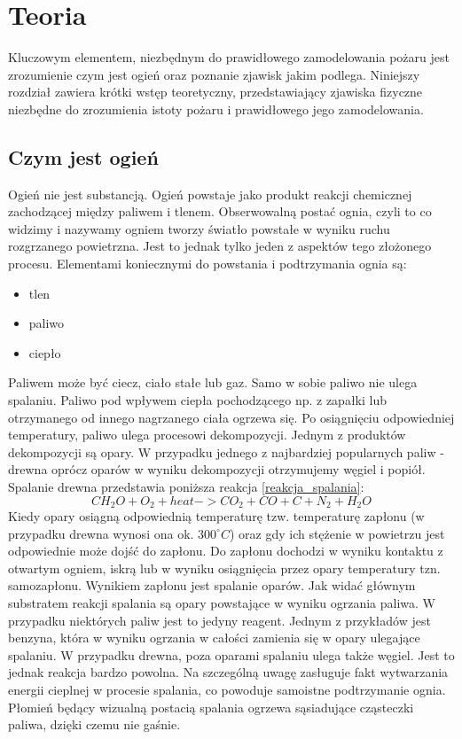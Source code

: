 ﻿%
\chapter{Teoria}
\label{cha:Teoria}
Kluczowym elementem, niezbędnym do prawidłowego zamodelowania pożaru
jest zrozumienie czym jest ogień oraz poznanie zjawisk jakim podlega. Niniejszy rozdział zawiera
krótki wstęp teoretyczny, przedstawiający zjawiska fizyczne niezbędne do zrozumienia istoty 
pożaru i prawidłowego jego zamodelowania.
\section {Czym jest ogień}
Ogień nie jest substancją.
Ogień powstaje jako produkt reakcji chemicznej zachodzącej między paliwem i tlenem.
Obserwowalną postać ognia, czyli to co widzimy i nazywamy ogniem tworzy światło powstałe w wyniku ruchu rozgrzanego powietrzna.
Jest to jednak tylko jeden z aspektów tego złożonego procesu.
Elementami koniecznymi do powstania i podtrzymania ognia są:
\begin{itemize}
\item tlen
\item paliwo
\item ciepło
\end{itemize}


Paliwem może być ciecz, ciało stałe lub gaz. Samo w sobie paliwo nie ulega spalaniu. 
Paliwo pod wpływem ciepła pochodzącego np. z zapałki lub otrzymanego od innego nagrzanego ciała ogrzewa się. Po osiągnięciu
odpowiedniej temperatury, paliwo ulega procesowi dekompozycji. Jednym z produktów dekompozycji
są opary. W przypadku jednego z najbardziej popularnych paliw - drewna oprócz oparów w wyniku dekompozycji otrzymujemy węgiel i popiół.
Spalanie drewna przedstawia poniższa reakcja \ref{reakcja_spalania}:
\begin {equation}
CH_2O+O_2 + heat ->CO_2 + CO+ C + N_2 + H_2O
\label {reakcja_spalania}
\end {equation}
Kiedy opary osiągną odpowiednią temperaturę tzw. temperaturę zapłonu (w przypadku drewna wynosi ona ok. $300^\circ C$) oraz gdy ich stężenie
w powietrzu jest odpowiednie może dojść do zapłonu. Do zapłonu dochodzi w wyniku kontaktu z otwartym ogniem, iskrą lub w wyniku osiągnięcia
przez opary temperatury tzn. samozapłonu. Wynikiem zapłonu jest spalanie oparów. Jak widać głównym substratem reakcji spalania są opary powstające w wyniku
ogrzania paliwa. W przypadku niektórych paliw jest to jedyny reagent. Jednym z przykładów jest benzyna, która w wyniku ogrzania w całości zamienia się w opary ulegające spalaniu. W przypadku drewna, poza oparami spalaniu ulega także węgiel. Jest to jednak reakcja bardzo powolna.
Na szczególną uwagę zasługuje fakt wytwarzania energii cieplnej w procesie spalania, co powoduje samoistne podtrzymanie ognia. Płomień będący
wizualną postacią spalania ogrzewa sąsiadujące cząsteczki paliwa, dzięki czemu nie gaśnie.

